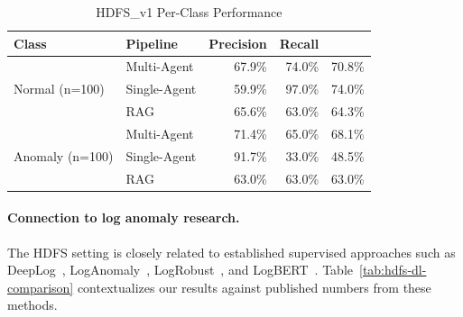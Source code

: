 \begin{table}[H]
\centering
\caption{HDFS\_v1 Per-Class Performance}
\label{tab:hdfs-perclass}
\begin{tabular}{llrrr}
\toprule
\textbf{Class} & \textbf{Pipeline} & \textbf{Precision} & \textbf{Recall} & \textbf{\fone{}} \\
\midrule
\multirow{3}{*}{Normal (n=100)}
 & Multi-Agent  & 67.9\% & 74.0\% & 70.8\% \\
 & Single-Agent & 59.9\% & 97.0\% & 74.0\% \\
 & RAG          & 65.6\% & 63.0\% & 64.3\% \\
\midrule
\multirow{3}{*}{Anomaly (n=100)}
 & Multi-Agent  & 71.4\% & 65.0\% & 68.1\% \\
 & Single-Agent & 91.7\% & 33.0\% & 48.5\% \\
 & RAG          & 63.0\% & 63.0\% & 63.0\% \\
\bottomrule
\end{tabular}
\end{table}

\paragraph{Connection to log anomaly research.}
The HDFS setting is closely related to established supervised approaches such as
DeepLog~\cite{du2017deeplog}, LogAnomaly~\cite{ijcai2019p658},
LogRobust~\cite{zhang2019logrobust}, and LogBERT~\cite{guo2021logbert}.
Table~\ref{tab:hdfs-dl-comparison} contextualizes our results against published numbers
from these methods.

